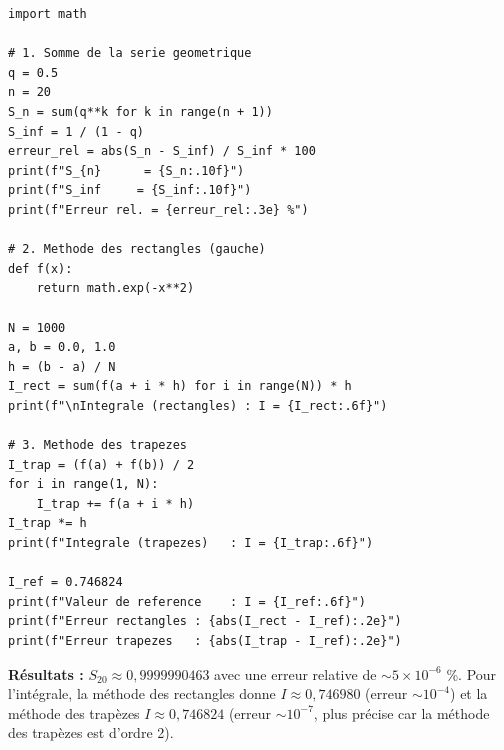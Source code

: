 \documentclass[12pt,a4paper]{article}
\begin{document}
\begin{boitecorrige}
\begin{lstlisting}
import math

# 1. Somme de la serie geometrique
q = 0.5
n = 20
S_n = sum(q**k for k in range(n + 1))
S_inf = 1 / (1 - q)
erreur_rel = abs(S_n - S_inf) / S_inf * 100
print(f"S_{n}      = {S_n:.10f}")
print(f"S_inf     = {S_inf:.10f}")
print(f"Erreur rel. = {erreur_rel:.3e} %")

# 2. Methode des rectangles (gauche)
def f(x):
    return math.exp(-x**2)

N = 1000
a, b = 0.0, 1.0
h = (b - a) / N
I_rect = sum(f(a + i * h) for i in range(N)) * h
print(f"\nIntegrale (rectangles) : I = {I_rect:.6f}")

# 3. Methode des trapezes
I_trap = (f(a) + f(b)) / 2
for i in range(1, N):
    I_trap += f(a + i * h)
I_trap *= h
print(f"Integrale (trapezes)   : I = {I_trap:.6f}")

I_ref = 0.746824
print(f"Valeur de reference    : I = {I_ref:.6f}")
print(f"Erreur rectangles : {abs(I_rect - I_ref):.2e}")
print(f"Erreur trapezes   : {abs(I_trap - I_ref):.2e}")
\end{lstlisting}

\textbf{Résultats :} $S_{20} \approx 0{,}9999990463$ avec une erreur relative de $\sim 5 \times 10^{-6}$ \%. Pour l'intégrale, la méthode des rectangles donne $I \approx 0{,}746980$ (erreur $\sim 10^{-4}$) et la méthode des trapèzes $I \approx 0{,}746824$ (erreur $\sim 10^{-7}$, plus précise car la méthode des trapèzes est d'ordre 2).
\end{boitecorrige}

\ifdefined\inMainDoc\else
\end{document}
